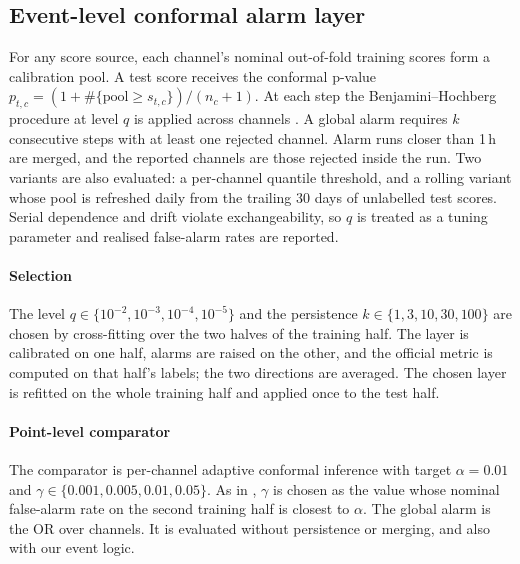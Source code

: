\documentclass[preprint,12pt,authoryear]{elsarticle}
\begin{document}
\subsection{Event-level conformal alarm layer}\label{sec:alarm}
For any score source, each channel's nominal out-of-fold training scores form a calibration
pool. A test score receives the conformal p-value
$p_{t,c}=(1+\#\{\text{pool}\ge s_{t,c}\})/(n_c+1)$. At each step the Benjamini--Hochberg
procedure at level $q$ is applied across channels \citep{bates2023,benjamini1995}. A global
alarm requires $k$ consecutive steps with at least one rejected channel. Alarm runs closer
than 1\,h are merged, and the reported channels are those rejected inside the run. Two
variants are also evaluated: a per-channel quantile threshold, and a rolling variant whose
pool is refreshed daily from the trailing 30 days of unlabelled test scores. Serial
dependence and drift violate exchangeability, so $q$ is treated as a tuning parameter and
realised false-alarm rates are reported.

\paragraph{Selection}
The level $q\in\{10^{-2},10^{-3},10^{-4},10^{-5}\}$ and the persistence
$k\in\{1,3,10,30,100\}$ are chosen by cross-fitting over the two halves of the training
half. The layer is calibrated on one half, alarms are raised on the other, and the official
metric is computed on that half's labels; the two directions are averaged. The chosen layer
is refitted on the whole training half and applied once to the test half.

\paragraph{Point-level comparator}
The comparator is per-channel adaptive conformal inference \citep{gibbs2021aci} with target
$\alpha=0.01$ and $\gamma\in\{0.001,0.005,0.01,0.05\}$. As in \citet{sahin2026tccad},
$\gamma$ is chosen as the value whose nominal false-alarm rate on the second training half is
closest to $\alpha$. The global alarm is the OR over channels. It is evaluated without
persistence or merging, and also with our event logic.

\end{document}
